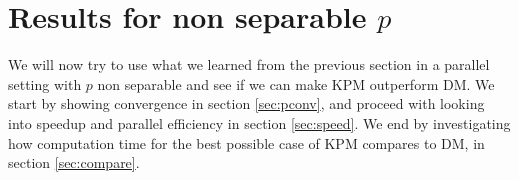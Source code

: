 \chapter{Results for non separable $p$} \label{sec:para}%
We will now try to use what we learned from the previous section in a parallel setting with $p$ non separable and see if we can make KPM outperform DM.
We start by showing convergence in section \ref{sec:pconv}, and proceed with looking into speedup and parallel efficiency in section \ref{sec:speed}. We end by investigating how computation time for the best possible case of KPM compares to DM, in section \ref{sec:compare}. 

